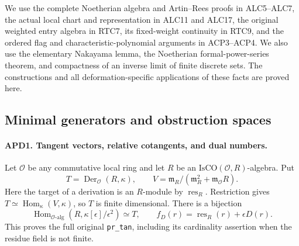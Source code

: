 \documentclass[11pt,a4paper]{article}
\numberwithin{equation}{section}
\theoremstyle{remark}\newtheorem{remark}[theorem]{Remark}
\begin{document}
We use the complete Noetherian algebra and Artin--Rees proofs in
ALC5--ALC7, the actual local chart and representation in ALC11 and
ALC17, the original weighted entry algebra in RTC7, its fixed-weight
continuity in RTC9, and the ordered flag and characteristic-polynomial
arguments in ACP3--ACP4.  We also use the elementary Nakayama lemma,
the Noetherian formal-power-series theorem, and compactness of an
inverse limit of finite discrete sets.  The constructions and all
deformation-specific applications of these facts are proved here.

\subsection{Minimal generators and obstruction spaces}

\paragraph{APD1. Tangent vectors, relative cotangents, and dual numbers.}
\label{claim:APD1}
Let \(\mathcal O\) be any commutative local ring and let
\(R\) be an \(\mathrm{IsCO}(\mathcal O,R)\)-algebra.  Put
\[
 T=\operatorname{Der}_{\mathcal O}(R,\kappa),\qquad
 V=\mathfrak m_R/(\mathfrak m_R^2+
                         \mathfrak m_{\mathcal O}R).
                                                               \tag{APD.3}
\]
Here the target of a derivation is an \(R\)-module by
\(\operatorname{res}_R\).  Restriction gives
\(T\simeq\operatorname{Hom}_\kappa(V,\kappa)\), so \(T\)
is finite dimensional.  There is a bijection
\[
 \operatorname{Hom}_{\mathcal O\text{-alg}}
       (R,\kappa[\epsilon]/\epsilon^2)\simeq T,
 \qquad f_D(r)=\operatorname{res}_R(r)+\epsilon D(r).
                                                               \tag{APD.4}
\]
This proves the full original \texttt{pr\_\allowbreak tan}, including its
cardinality assertion when the residue field is not finite.
\end{document}
